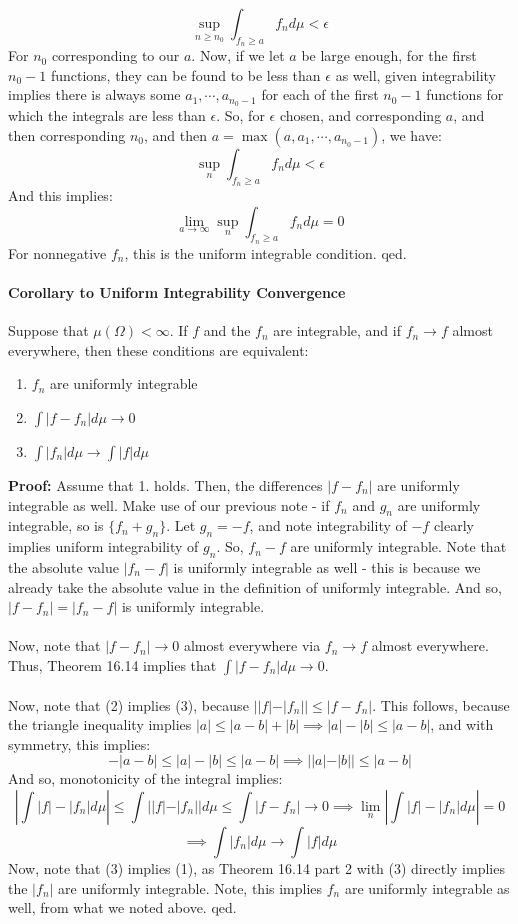 \documentclass[12pt,a4paper]{article}
\newcommand{\1}[1]{\mathbbm{1}\left\{ #1 \right\}}
\begin{document}
$$
	\sup_{n \geq n_0} \int_{f_n \geq a} f_n d\mu < \epsilon
$$
For $n_0$ corresponding to our $a$. Now, if we let $a$ be large enough, for the first $n_0 - 1$ functions, they can be found to be less than $\epsilon$ as well, given integrability implies there is always some $a_1, \cdots, a_{n_0-1}$ for each of the first $n_0 - 1$ functions for which the integrals are less than $\epsilon$. So, for $\epsilon$ chosen, and corresponding $a$, and then corresponding $n_0$, and then $a = \max(a, a_1, \cdots, a_{n_0 - 1})$, we have:
$$
	\sup_n \int_{f_n \geq a} f_n d\mu < \epsilon
$$
And this implies:
$$
	\lim_{a \to \infty} \sup_n \int_{f_n \geq a} f_n d\mu = 0
$$
For nonnegative $f_n$, this is the uniform integrable condition. qed.

\paragraph{Corollary to Uniform Integrability Convergence} Suppose that $\mu(\Omega) < \infty$. If $f$ and the $f_n$ are integrable, and if $f_n \to f$ almost everywhere, then these conditions are equivalent:
\begin{enumerate}
	\item $f_n$ are uniformly integrable
	\item $\int |f - f_n| d\mu \to 0$
	\item $\int |f_n| d\mu \to \int |f| d\mu$
\end{enumerate}
\textbf{Proof:} Assume that 1. holds. Then, the differences $|f - f_n|$ are uniformly integrable as well. Make use of our previous note - if $f_n$ and $g_n$ are uniformly integrable, so is $\{f_n + g_n\}$. Let $g_n = -f$, and note integrability of $-f$ clearly implies uniform integrability of $g_n$. So, $f_n - f$ are uniformly integrable. Note that the absolute value $|f_n - f|$ is uniformly integrable as well - this is because we already take the absolute value in the definition of uniformly integrable. And so, $|f - f_n| = |f_n - f|$ is uniformly integrable.
\\\\
Now, note that $|f - f_n| \to 0$ almost everywhere via $f_n \to f$ almost everywhere. Thus, Theorem 16.14 implies that $\int |f - f_n| d\mu \to 0$.
\\\\
Now, note that (2) implies (3), because $||f| - |f_n|| \leq |f - f_n|$. This follows, because the triangle inequality implies $|a| \leq |a - b| + |b| \implies |a| - |b| \leq |a - b|$, and with symmetry, this implies:
$$
	-|a - b| \leq |a| - |b| \leq |a - b| \implies
	||a| - |b|| \leq |a - b|
$$
And so, monotonicity of the integral implies:
$$
	\left|\int |f| - |f_n| d\mu\right| \leq 
	\int ||f| - |f_n|| d\mu \leq \int |f - f_n| \to 0
	\implies
	\lim_n \left|\int |f| - |f_n| d\mu\right| = 0
$$
$$
	\implies \int |f_n| d\mu \to \int |f| d\mu
$$
Now, note that (3) implies (1), as Theorem 16.14 part 2 with (3) directly implies the $|f_n|$ are uniformly integrable. Note, this implies $f_n$ are uniformly integrable as well, from what we noted above. qed.
\end{document}
